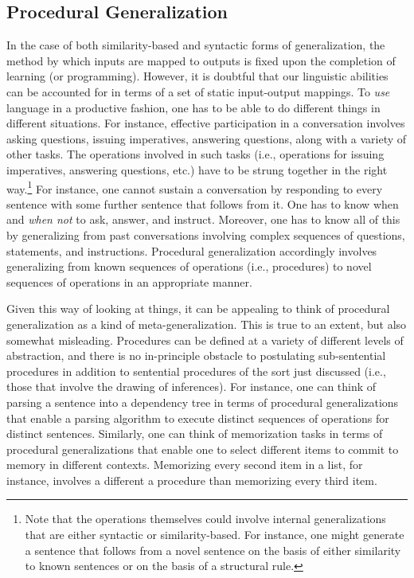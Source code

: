 \subsection{Procedural Generalization}

In the case of both similarity-based and syntactic forms of generalization, the method by which inputs are mapped to outputs is fixed upon the completion of learning (or programming). However, it is doubtful that our linguistic abilities can be accounted for in terms of a set of static input-output mappings. To \textit{use} language in a productive fashion, one has to be able to do different things in different situations. For instance, effective participation in a conversation involves asking questions, issuing imperatives, answering questions, along with a variety of other tasks. The operations involved in such tasks (i.e., operations for issuing imperatives, answering questions, etc.) have to be strung together in the right way.\footnote{Note that the operations themselves could involve internal generalizations that are either syntactic or similarity-based. For instance, one might generate a sentence that follows from a novel sentence on the basis of either similarity to known sentences or on the basis of a structural rule.} For instance, one cannot sustain a conversation by responding to every sentence with some further sentence that follows from it. One has to know when and \textit{when not} to ask, answer, and instruct. Moreover, one has to know all of this by generalizing from past conversations involving complex sequences of questions, statements, and instructions. Procedural generalization accordingly involves generalizing from known sequences of operations (i.e., procedures) to novel sequences of operations in an appropriate manner.
 
Given this way of looking at things, it can be appealing to think of procedural generalization as a kind of meta-generalization. This is true to an extent, but also somewhat misleading. Procedures can be defined at a variety of different levels of abstraction, and there is no in-principle obstacle to postulating sub-sentential procedures in addition to sentential procedures of the sort just discussed (i.e., those that involve the drawing of inferences). For instance, one can think of parsing a sentence into a dependency tree in terms of procedural generalizations that enable a parsing algorithm to execute distinct sequences of operations for distinct sentences. Similarly, one can think of memorization tasks in terms of procedural generalizations that enable one to select different items to commit to memory in different contexts. Memorizing every second item in a list, for instance, involves a different a procedure than memorizing every third item.


